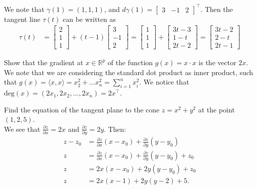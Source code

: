 \documentclass[12pt]{book}
\newcommand{\R}{\mathbb{R}}
\newenvironment{exercise}[2][Exercise]{\begin{trivlist}
\item[\hskip \labelsep {\bfseries #1}\hskip \labelsep {\bfseries #2.}]}{\end{trivlist}}
\begin{document}
\begin{exercise}{7.2.7}
\begin{exercise}{9.4.3}
    We note that $\gamma(1) = (1,1,1)$, and $d\gamma(1) = \begin{bmatrix} 3 & -1 & 2 \end{bmatrix}^\intercal$. Then the tangent line $\tau(t)$ can be written as
        \begin{align*}
            \tau(t) &= \begin{bmatrix} 2 \\ 1\\1 \end{bmatrix} + (t-1) \begin{bmatrix} 3 \\ -1 \\ 2 \end{bmatrix} = \begin{bmatrix} 1 \\ 1\\1 \end{bmatrix} + \begin{bmatrix} 3 t - 3 \\ 1 - t\\ 2 t - 2 \end{bmatrix} = \begin{bmatrix} 3t -2 \\ 2- t \\ 2 t - 1 \end{bmatrix}
        \end{align*}
\end{exercise}


\begin{exercise}{9.4.6}
    Show that the gradient  at $x \in \R^p$ of the function $g(x) = x \cdot x$ is the vector $2x$. \\

    We note that we are considering the standard dot product as inner product, such that $g(x) = \langle x, x \rangle = x_2^2 + \hdots x_n^2 = \sum_{i=1}^n x_i^2$. We notice that $\text{deg}(x) = (2 x_1, 2x_2, \hdots, 2 x_n) = 2 x^\intercal$.
\end{exercise}


\begin{exercise}{9.4.11}
    Find the equation of the tangent plane to the cone $z = x^2 + y^2$ at the point $(1,2,5)$. \\

    We see that $\frac{\partial z}{\partial x}= 2x$ and $\frac{\partial z}{\partial y} = 2y$. Then:
    \begin{align*}
    z - z_0 &= \frac{\partial z}{\partial x}(x-x_0) + \frac{\partial z}{\partial y} (y-y_0)\\
    z &= \frac{\partial z}{\partial x}(x-x_0) + \frac{\partial z}{\partial y} (y-y_0 ) + z_0 \\
    z &= 2 x (x - x_0) + 2 y (y-y_0) + z_0 \\
    z &= 2 x (x -1) + 2 y(y-2) + 5.
    \end{align*}
\end{exercise}


\end{exercise}
\end{document}
